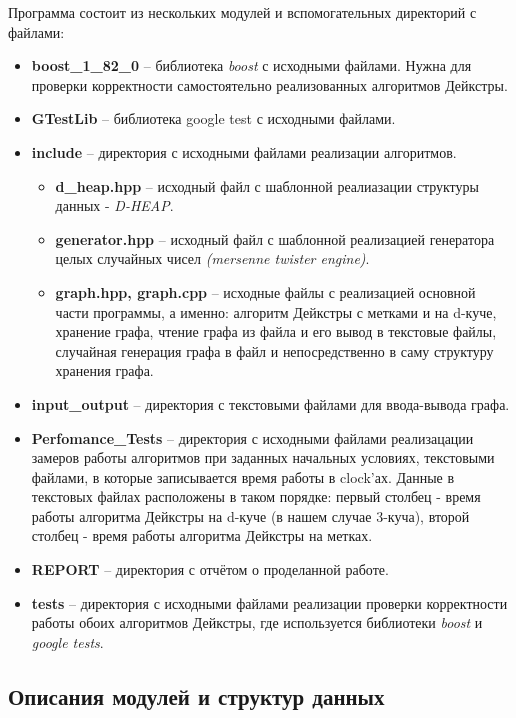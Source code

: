 \begin{text}
Программа состоит из нескольких модулей и вспомогательных директорий с файлами:
\begin{itemize}
	\item \textbf{boost\_1\_82\_0} -- библиотека \textit{boost} с исходными файлами. Нужна для проверки корректности самостоятельно реализованных алгоритмов Дейкстры. 
	\item \textbf{GTestLib} -- библиотека google test с исходными файлами.
	\item \textbf{include} -- директория с исходными файлами реализации алгоритмов.
		\begin{itemize}
				\item \textbf{d\_heap.hpp} -- исходный файл с шаблонной реалиазации 	структуры данных - \mbox{\textit{D-HEAP}}.
				\item \textbf{generator.hpp} -- исходный файл с шаблонной реализацией генератора целых случайных чисел \textit{(mersenne twister engine)}.
				\item \textbf{graph.hpp, graph.cpp} -- исходные файлы с реализацией основной части программы, а именно: алгоритм Дейкстры с метками и на d-куче, хранение графа, чтение графа из файла и его вывод в текстовые файлы, случайная генерация графа в файл и непосредственно в саму структуру хранения графа.
		\end{itemize}
	\item \textbf{input\_output} -- директория с текстовыми файлами для ввода-вывода графа.
	\item \textbf{Perfomance\_Tests} -- директория с исходными файлами реализацации замеров работы алгоритмов при заданных начальных условиях, текстовыми файлами, в которые записывается время работы в clock'ах. Данные в текстовых файлах расположены в таком порядке: первый столбец - время работы алгоритма Дейкстры на d-куче (в нашем случае 3-куча), второй столбец - время работы алгоритма Дейкстры на метках. 
	\item \textbf{REPORT} -- директория с отчётом о проделанной работе.
	\item \textbf{tests} -- директория с исходными файлами реализации проверки корректности работы обоих алгоритмов Дейкстры, где используется библиотеки \textit{boost} и \textit{google tests}.

\end{itemize}

\newpage
\subsection{Описания модулей и структур данных}

\end{text}
